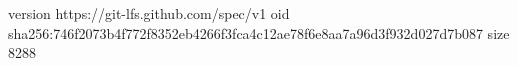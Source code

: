 version https://git-lfs.github.com/spec/v1
oid sha256:746f2073b4f772f8352eb4266f3fca4c12ae78f6e8aa7a96d3f932d027d7b087
size 8288
